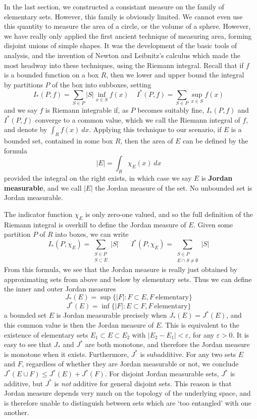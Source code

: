 In the last section, we constructed a consistant measure on the family of elementary sets. However, this family is obviously limited. We cannot even use this quantity to measure the area of a circle, or the volume of a sphere. However, we have really only applied the first ancient technique of measuring area, forming disjoint unions of simple shapes. It was the development of the basic tools of analysis, and the invention of Newton and Leibnitz's calculus which made the most headway into these techniques, using the Riemann integral. Recall that if $f$ is a bounded function on a box $R$, then we lower and upper bound the integral by partitions $P$ of the box into subboxes, setting
%
\[ I_*(P,f) = \sum_{S \in P} |S| \inf_{x \in S} f(x)\ \ \ \ \ I^*(P,f) = \sum_{S \in P} \sup_{x \in S} f(x) \]
%
and we say $f$ is Riemann integrable if, as $P$ becomes suitably fine, $I_*(P,f)$ and $I^*(P,f)$ converge to a common value, which we call the Riemann integral of $f$, and denote by $\int_R f(x)\ dx$. Applying this technique to our scenario, if $E$ is a bounded set, contained in some box $R$, then the area of $E$ can be defined by the formula
%
\[ |E| = \int_R \chi_E(x)\ dx \]
%
provided the integral on the right exists, in which case we say $E$ is {\bf Jordan measurable}, and we call $|E|$ the Jordan measure of the set. No unbounded set is Jordan measurable.

The indicator function $\chi_E$ is only zero-one valued, and so the full definition of the Riemann integral is overkill to define the Jordan measure of $E$. Given some partition $P$ of $R$ into boxes, we can write
%
\[ I_*(P,\chi_E) = \sum_{\substack{S \in P\\S \subset E}} |S|\ \ \ \ \ \ \ \ I^*(P,\chi_E) = \sum_{\substack{S \in P\\E \cap S \neq \emptyset}} |S| \]
%
From this formula, we see that the Jordan measure is really just obtained by approximating sets from above and below by elementary sets. Thus we can define the inner and outer Jordan measures
%
\[ J_*(E) = \sup \{ |F| : F \subset E, F\ \text{elementary} \} \]
\[ J^*(E) = \inf \{ |F| : E \subset F, F\ \text{elementary} \} \]
%
a bounded set $E$ is Jordan measurable precisely when $J_*(E) = J^*(E)$, and this common value is then the Jordan measure of $E$. This is equivalent to the existence of elementary sets $E_1 \subset E \subset E_2$ with $|E_2 - E_1| < \varepsilon$, for any $\varepsilon > 0$. It is easy to see that $J_*$ and $J^*$ are both monotone, and therefore the Jordan measure is monotone when it exists. Furthermore, $J^*$ is subadditive. For any two sets $E$ and $F$, regardless of whether they are Jordan measurable or not, we conclude $J^*(E \cup F) \leq J^*(E) + J^*(F)$. For disjoint Jordan measurable sets, $J^*$ is additive, but $J^*$ is {\it not} additive for general disjoint sets. This reason is that Jordan measure depends very much on the topology of the underlying space, and is therefore unable to distinguish between sets which are `too entangled' with one another.

